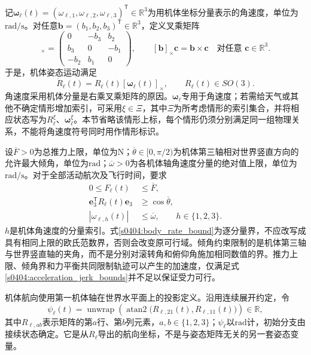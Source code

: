 记$\boldsymbol\omega_\ell(t)=(\omega_{\ell,1},\omega_{\ell,2},\omega_{\ell,3})^{\mathsf T}\in\mathbb R^3$为用机体坐标分量表示的角速度，单位为$\mathrm{rad/s}$。对任意$\mathbf b=(b_1,b_2,b_3)^{\mathsf T}\in\mathbb R^3$，定义叉乘矩阵
\begin{equation}
 [\mathbf b]_\times=
 \begin{pmatrix}
 0&-b_3&b_2\\
 b_3&0&-b_1\\
 -b_2&b_1&0
 \end{pmatrix},
 \qquad
 [\mathbf b]_\times\mathbf c=\mathbf b\times\mathbf c
 \quad\text{对任意 }\mathbf c\in\mathbb R^3.
 \label{s0404:cross_matrix}
\end{equation}
于是，机体姿态运动满足
\begin{equation}
 \dot R_\ell(t)=R_\ell(t)[\boldsymbol\omega_\ell(t)]_\times,
 \qquad R_\ell(t)\in SO(3).
 \label{s0404:rotation_kinematics}
\end{equation}
角速度采用机体分量是右乘叉乘矩阵的原因。$\boldsymbol\omega_\ell$专用于角速度；若需给天气或其他不确定情形增加索引，可采用$\xi\in\Xi$，其中$\Xi$为所考虑情形的索引集合，并将相应状态写为$R_\ell^{\xi}$、$\boldsymbol\omega_\ell^{\xi}$。本节省略该情形上标，每个情形仍须分别满足同一组物理关系，不能将角速度符号同时用作情形标识。

设$\overline F>0$为总推力上限，单位为$\mathrm N$；$\overline\theta\in[0,\pi/2)$为机体第三轴相对世界竖直方向的允许最大倾角，单位为$\mathrm{rad}$；$\overline\omega>0$为各机体轴角速度分量的绝对值上限，单位为$\mathrm{rad/s}$。对于全部活动航次及飞行时间，要求
\begin{subequations}
\label{s0404:attitude_bounds}
\begin{align}
 0\le F_\ell(t)&\le\overline F,
 \label{s0404:thrust_bound}\\
 \mathbf e_3^{\mathsf T}R_\ell(t)\mathbf e_3
 &\ge\cos\overline\theta,
 \label{s0404:tilt_bound}\\
 |\omega_{\ell,h}(t)|&\le\overline\omega,
 \qquad h\in\{1,2,3\}.
 \label{s0404:body_rate_bound}
\end{align}
\end{subequations}
$h$是机体角速度的分量索引。式\eqref{s0404:body_rate_bound}为逐分量界，不应改写成具有相同上限的欧氏范数界，否则会改变原可行域。倾角约束限制的是机体第三轴与世界竖直轴的夹角，而不是分别对滚转角和俯仰角施加相同数值的界。推力上限、倾角界和力平衡共同限制轨迹可以产生的加速度，仅满足式\eqref{s0404:acceleration_jerk_bounds}并不足以保证受力可行。

机体航向使用第一机体轴在世界水平面上的投影定义。沿用连续展开约定，令
\begin{equation}
 \psi_\ell(t)=\operatorname{unwrap}
 \left(\operatorname{atan2}
 \bigl(R_{\ell,21}(t),R_{\ell,11}(t)\bigr)\right)
 \in\mathbb R,
 \label{s0404:continuous_yaw}
\end{equation}
其中$R_{\ell,ab}$表示矩阵的第$a$行、第$b$列元素，$a,b\in\{1,2,3\}$；$\psi_\ell$以$\mathrm{rad}$计，初始分支由接续状态确定。它是从$R_\ell$导出的航向坐标，不是与姿态矩阵无关的另一套姿态变量。

